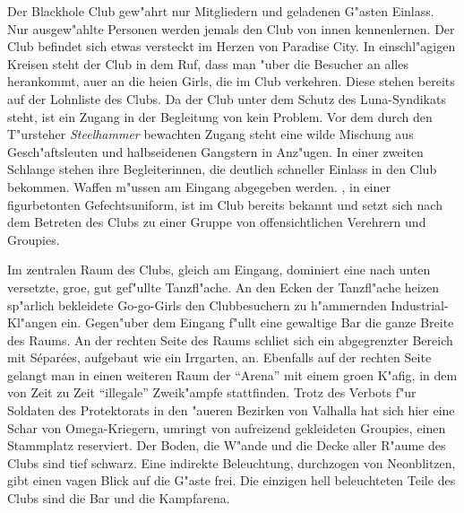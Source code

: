 
Der Blackhole Club gew"ahrt nur Mitgliedern und geladenen G"asten Einlass. Nur ausgew"ahlte Personen werden jemals den Club von innen kennenlernen. Der Club befindet sich etwas versteckt im Herzen von Paradise City. In einschl"agigen Kreisen steht der Club in dem Ruf, dass man "uber die Besucher an alles herankommt, au\3er an die hei\3en Girls, die im Club verkehren. Diese stehen bereits auf der Lohnliste des Clubs. Da der Club unter dem Schutz des Luna-Syndikats steht, ist ein Zugang in der Begleitung von \xl{} kein Problem. Vor dem durch den T"ursteher \emph{Steelhammer} bewachten Zugang steht eine wilde Mischung aus Gesch"aftsleuten und halbseidenen Gangstern in Anz"ugen. In einer zweiten Schlange stehen ihre Begleiterinnen, die deutlich schneller Einlass in den Club bekommen. Waffen m"ussen am Eingang abgegeben werden. \xl{}, in einer figurbetonten Gefechtsuniform, ist im Club bereits bekannt und setzt sich nach dem Betreten des Clubs zu einer Gruppe von offensichtlichen Verehrern und Groupies.

Im zentralen Raum des Clubs, gleich am Eingang, dominiert eine nach unten versetzte, gro\3e, gut gef"ullte Tanzfl"ache. An den Ecken der Tanzfl"ache heizen sp"arlich bekleidete Go-go-Girls den Clubbesuchern zu h"ammernden Industrial-Kl"angen ein. Gegen"uber dem Eingang f"ullt eine gewaltige Bar die ganze Breite des Raums. An der rechten Seite des Raums schlie\3t sich ein abgegrenzter Bereich mit S\'epar\'ees, aufgebaut wie ein Irrgarten, an. Ebenfalls auf der rechten Seite gelangt man in einen weiteren Raum der ``Arena'' mit einem gro\3en K"afig, in dem von Zeit zu Zeit ``illegale'' Zweik"ampfe stattfinden. Trotz des Verbots f"ur Soldaten des Protektorats in den "au\3eren Bezirken von Valhalla hat sich hier eine Schar von Omega-Kriegern, umringt von aufreizend gekleideten Groupies, einen Stammplatz reserviert. Der Boden, die W"ande und die Decke aller R"aume des Clubs sind tief schwarz. Eine indirekte Beleuchtung, durchzogen von Neonblitzen, gibt einen vagen Blick auf die G"aste frei. Die einzigen hell beleuchteten Teile des Clubs sind die Bar und die Kampfarena.



